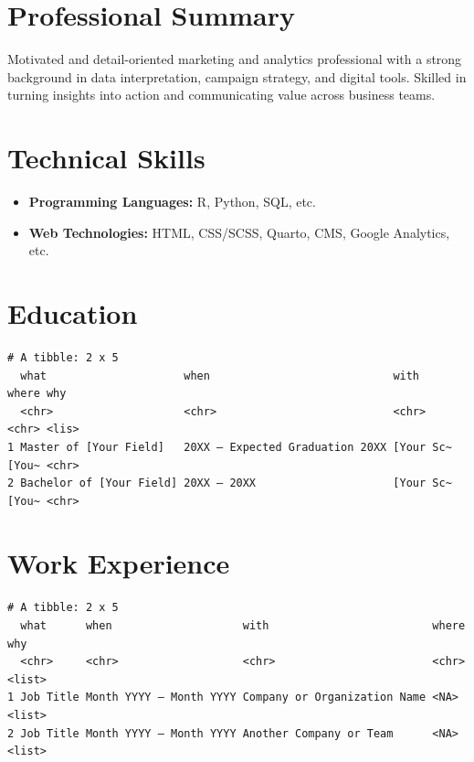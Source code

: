 \documentclass[
]{article}
\author{}
\date{\vspace{-2.5em}May 2026}
\providecommand{\tightlist}{%
  \setlength{\itemsep}{0pt}\setlength{\parskip}{0pt}}
\begin{document}
\section{Professional Summary}\label{professional-summary}

Motivated and detail-oriented marketing and analytics professional with
a strong background in data interpretation, campaign strategy, and
digital tools. Skilled in turning insights into action and communicating
value across business teams.

\section{Technical Skills}\label{technical-skills}

\begin{itemize}
\tightlist
\item
  \textbf{Programming Languages:} R, Python, SQL, etc.\\
\item
  \textbf{Web Technologies:} HTML, CSS/SCSS, Quarto, CMS, Google
  Analytics, etc.
\end{itemize}

\section{Education}\label{education}

\begin{verbatim}
# A tibble: 2 x 5
  what                     when                            with      where why  
  <chr>                    <chr>                           <chr>     <chr> <lis>
1 Master of [Your Field]   20XX – Expected Graduation 20XX [Your Sc~ [You~ <chr>
2 Bachelor of [Your Field] 20XX – 20XX                     [Your Sc~ [You~ <chr>
\end{verbatim}

\section{Work Experience}\label{work-experience}

\begin{verbatim}
# A tibble: 2 x 5
  what      when                    with                         where why   
  <chr>     <chr>                   <chr>                        <chr> <list>
1 Job Title Month YYYY – Month YYYY Company or Organization Name <NA>  <list>
2 Job Title Month YYYY – Month YYYY Another Company or Team      <NA>  <list>
\end{verbatim}
\end{document}
